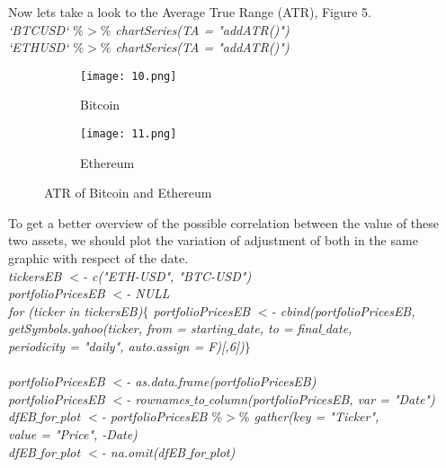 \documentclass[14pt]{amsart}
\begin{document}
Now lets take a look to the Average True Range (ATR), Figure 5.\\

\noindent \textit{`BTCUSD` $\%>\%$ chartSeries(TA = "addATR()")}\\
\noindent \textit{`ETHUSD` $\%>\%$ chartSeries(TA = "addATR()")}\\

\begin{figure}[h!]
  \centering
  \begin{subfigure}[b]{0.4\linewidth}
    \texttt{[image: 10.png]}
    \caption{Bitcoin}
  \end{subfigure}
  \begin{subfigure}[b]{0.4\linewidth}
    \texttt{[image: 11.png]}
    \caption{Ethereum}
  \end{subfigure}
  \caption{ATR of Bitcoin and Ethereum}
  \label{fig:coffee}
\end{figure}

To get a better overview of the possible correlation between the value of these two assets, we should plot the variation of adjustment of both in the same graphic with respect of the date.\\

\noindent \textit{tickersEB $<$- c("ETH-USD", "BTC-USD")}\\
\noindent \textit{portfolioPricesEB $<$- NULL}\\
\noindent \textit{for (ticker in tickersEB)$\{$  portfolioPricesEB $<$- cbind(portfolioPricesEB, }\\
\indent\textit{getSymbols.yahoo(ticker, from = starting$\_$date, to = final$\_$date, }\\
\indent\textit{periodicity = "daily", auto.assign = F)[,6])$\}$}\\ \\

\noindent \textit{portfolioPricesEB $<$- as.data.frame(portfolioPricesEB)}\\
\noindent \textit{portfolioPricesEB $<$- rownames$\_$to$\_$column(portfolioPricesEB, var = "Date")}\\
\noindent \textit{dfEB$\_$for$\_$plot $<$- portfolioPricesEB $\%>\%$ gather(key = "Ticker", }\\
\indent\textit{value = "Price", -Date)}\\
\noindent \textit{dfEB$\_$for$\_$plot $<$- na.omit(dfEB$\_$for$\_$plot)}\\ \\
\end{document}
